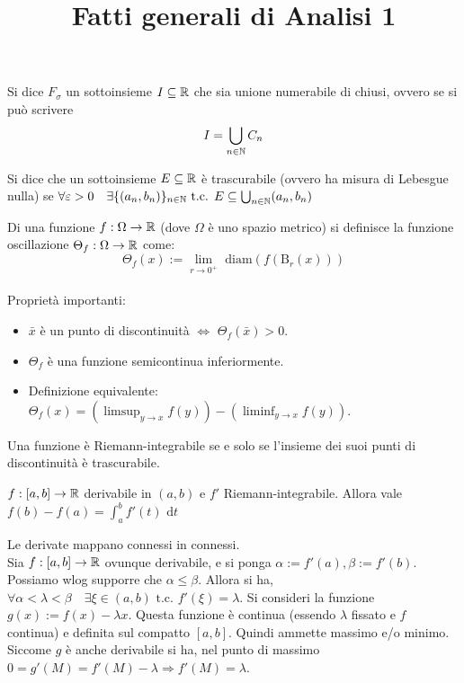 \documentclass[a4paper,NoNotes]{stdmdoc}
\newcommand{\B}{\mbox{B}}
\newcommand{\diam}{\mbox{ diam}}
\newcommand{\tc}{\mbox{ t.c. }}
\newcommand{\de}{\mbox{ d}}
\begin{document}
\title{Fatti generali di Analisi 1}

 Si dice $F_\sigma$ un sottoinsieme $I \subseteq \RR$ che sia unione numerabile di chiusi, ovvero se si può scrivere $$I = \bigcup_{n\in\NN} C_n$$

 Si dice che un sottoinsieme $E \subseteq \RR$ è trascurabile (ovvero ha misura di Lebesgue nulla) se $\forall \varepsilon > 0 \quad \exists \{(a_n, b_n)\}_{n\in\NN} \tc E \subseteq \bigcup_{n\in\NN} (a_n, b_n)$

 Di una funzione $f: \Omega \rightarrow \RR$ (dove $\Omega$ è uno spazio metrico) si definisce la funzione oscillazione $\Theta_{f}: \Omega \rightarrow \RR$ come: $$\Theta_{f}(x) := \lim_{r \rightarrow 0^{+}} \diam (f(\B_r(x)))$$ \\
Proprietà importanti: \begin{itemize}
	\item $\bar{x}$ è un punto di discontinuità $\Leftrightarrow$ $\Theta_f(\bar{x}) > 0$.
	\item $\Theta_f$ è una funzione semicontinua inferiormente.
	\item Definizione equivalente: $\Theta_f(x) = \left( \limsup_{y \rightarrow x} f(y) \right) - \left( \liminf_{y \rightarrow x} f(y) \right)$.
\end{itemize}

 Una funzione è Riemann-integrabile se e solo se l'insieme dei suoi punti di discontinuità è trascurabile.

 $f: [a, b] \rightarrow \RR$ derivabile in $(a,b)$ e $f'$ Riemann-integrabile. Allora vale $f(b) - f(a) = \int_{a}^{b} f'(t) \de t$

 Le derivate mappano connessi in connessi. \\
Sia $f: [a,b] \rightarrow \RR$ ovunque derivabile, e si ponga $\alpha := f'(a), \beta := f'(b)$. Possiamo wlog supporre che $\alpha \le \beta$. Allora si ha, $\forall \alpha < \lambda < \beta \quad \exists \xi \in (a, b) \tc f'(\xi) = \lambda$.
\Dimostrazione Si consideri la funzione $g(x) := f(x) - \lambda x$. Questa funzione è continua (essendo $\lambda$ fissato e $f$ continua) e definita sul compatto $[a,b]$. Quindi ammette massimo e/o minimo. Siccome $g$ è anche derivabile si ha, nel punto di massimo $0 = g'(M) = f'(M) - \lambda \Rightarrow f'(M) = \lambda$.
\end{document}
